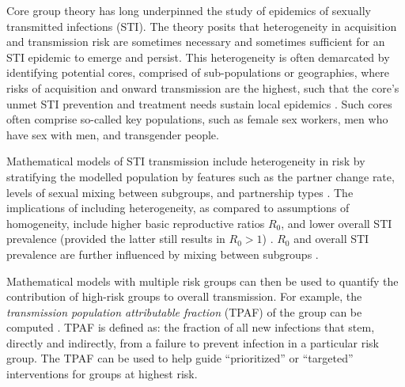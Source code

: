 Core group theory has long underpinned the study of
epidemics of sexually transmitted infections (STI).
The theory posits that heterogeneity in
acquisition and transmission risk are
sometimes necessary and sometimes sufficient for
an STI epidemic to emerge and persist.
This heterogeneity is often demarcated by identifying potential cores,
comprised of sub-populations or geographies,
where risks of acquisition and onward transmission are the highest,
such that the core's unmet STI prevention and treatment needs
sustain local epidemics \citep{Yorke1978,Gesink2011}.
Such cores often comprise so-called key populations, such as
female sex workers,
men who have sex with men,
and transgender people.
\par
Mathematical models of STI transmission include heterogeneity in risk
by stratifying the modelled population by features such as
the partner change rate,
levels of sexual mixing between subgroups, and
partnership types \citep{Mishra2012}.
The implications of including heterogeneity,
as compared to assumptions of homogeneity, include
higher basic reproductive ratios $R_0$, and
lower overall STI prevalence
(provided the latter still results in $R_0 > 1$) \citep{Boily1997}.
$R_0$ and overall STI prevalence are further influenced by
mixing between subgroups \citep{Stigum1994,Boily1997}.
\par %
Mathematical models with multiple risk groups can then be used to quantify
the contribution of high-risk groups to overall transmission.
For example, the \textit{transmission population attributable fraction} (TPAF)
of the group can be computed \citep{Mishra2012}.
TPAF is defined as: the fraction of all new infections that stem,
directly and indirectly, from a failure to prevent infection
in a particular risk group.
The TPAF can be used to help guide ``prioritized'' or ``targeted'' interventions
for groups at highest risk.
\par
